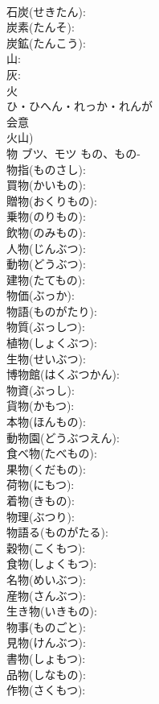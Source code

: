 \documentclass[8pt]{extreport}
\begin{document}
\begin{CJK}{UTF8}{min}
\\	石炭(せきたん): 
\\	炭素(たんそ): 
\\	炭鉱(たんこう): 
\\	山: 
\\	灰: 
\\	火	
\\	ひ・ひへん・れっか・れんが	
\\	会意 
\\	火山) 
\\	物	ブツ、モツ	もの、もの-		
\\	物指(ものさし): 
\\	買物(かいもの): 
\\	贈物(おくりもの): 
\\	乗物(のりもの): 
\\	飲物(のみもの): 
\\	人物(じんぶつ): 
\\	動物(どうぶつ): 
\\	建物(たてもの): 
\\	物価(ぶっか): 
\\	物語(ものがたり): 
\\	物質(ぶっしつ): 
\\	植物(しょくぶつ): 
\\	生物(せいぶつ): 
\\	博物館(はくぶつかん): 
\\	物資(ぶっし): 
\\	貨物(かもつ): 
\\	本物(ほんもの): 
\\	動物園(どうぶつえん): 
\\	食べ物(たべもの): 
\\	果物(くだもの): 
\\	荷物(にもつ): 
\\	着物(きもの): 
\\	物理(ぶつり): 
\\	物語る(ものがたる): 
\\	穀物(こくもつ): 
\\	食物(しょくもつ): 
\\	名物(めいぶつ): 
\\	産物(さんぶつ): 
\\	生き物(いきもの): 
\\	物事(ものごと): 
\\	見物(けんぶつ): 
\\	書物(しょもつ): 
\\	品物(しなもの): 
\\	作物(さくもつ): 

\end{CJK}
\end{document}
